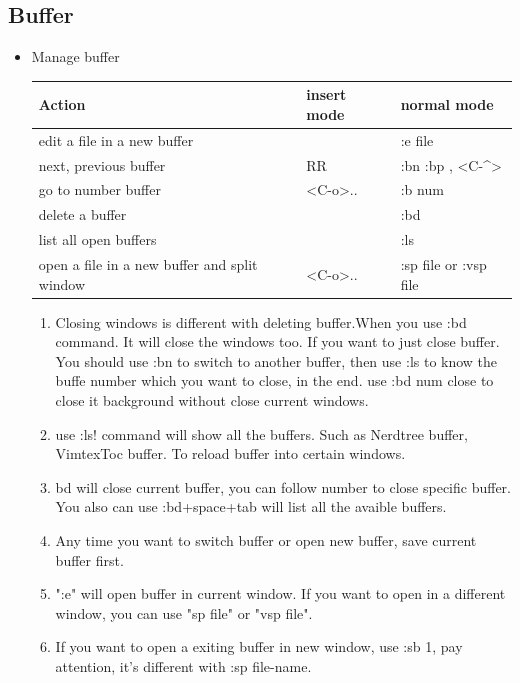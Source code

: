\documentclass[a4paper,12pt,twoside]{book}
\begin{document}
\subsection{Buffer}
\begin{itemize}
		\item Manage buffer
\begin{center}
\begin{tabular}{p{}|p{}|p{}}
   \hline
		Action & insert mode & normal mode \\
		
\hline 
		edit a file in a new buffer & &  :e file\\
				
		\hline 
		next, previous buffer & RR &  :bn :bp , <C-\^{}> \\
		
        \hline 
		go to number buffer &<C-o>.. &  :b num \\		
		
		\hline 
		delete a buffer & & :bd \\
		
		\hline 
		list all open buffers & & :ls\\
		
		\hline
		open a file in a new buffer and split window
	 & <C-o>..& :sp file or :vsp file \\
	\hline 	
			\end{tabular}
	\end{center}

	\begin{enumerate}
			\item Closing windows is different with deleting buffer.When you use :bd command. It will close the windows too. If you want to just close buffer. You should use :bn to switch to another buffer, then use :ls to know the buffe number which you want to close, in the end. use :bd num close to close it background without close current windows.

				\item use :ls! command will show all the buffers. Such as Nerdtree buffer, VimtexToc buffer. To reload buffer into certain windows. 

			\item bd will close current buffer, you can follow number to close specific buffer. You also can use :bd+space+tab will list all the avaible buffers.

			\item Any time you want to switch buffer or open new buffer, save current buffer first.

			\item ":e" will open buffer in current window. If you want to open in a different window, you can use "sp file" or "vsp file".
			\item If you want to open a exiting buffer in new window, use :sb 1, pay attention, it's different with :sp file-name.
	\end{enumerate}
	\end{itemize}
\end{document}
